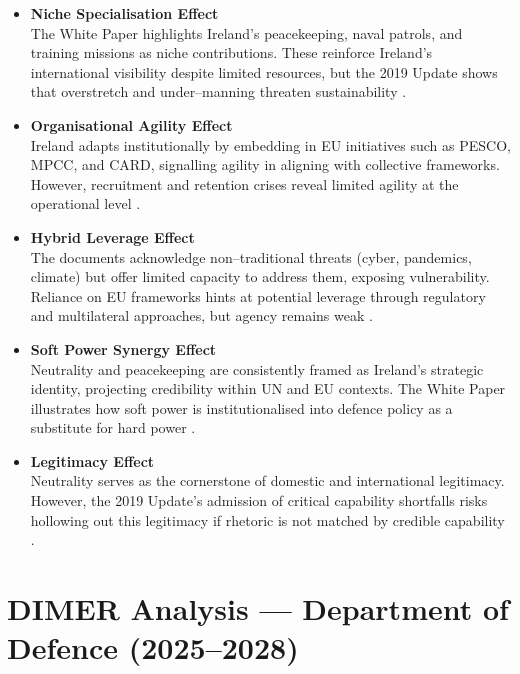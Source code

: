 \begin{itemize}
	\item \textbf{Niche Specialisation Effect} \\
	The White Paper highlights Ireland’s peacekeeping, naval patrols, and training missions as niche contributions. These reinforce Ireland’s international visibility despite limited resources, but the 2019 Update shows that overstretch and under–manning threaten sustainability \parencite{WHITE_2015}.
	
	\item \textbf{Organisational Agility Effect} \\
	Ireland adapts institutionally by embedding in EU initiatives such as PESCO, MPCC, and CARD, signalling agility in aligning with collective frameworks. However, recruitment and retention crises reveal limited agility at the operational level \parencite{WHITE_2015}.
	
	\item \textbf{Hybrid Leverage Effect} \\
	The documents acknowledge non–traditional threats (cyber, pandemics, climate) but offer limited capacity to address them, exposing vulnerability. Reliance on EU frameworks hints at potential leverage through regulatory and multilateral approaches, but agency remains weak \parencite{WHITE_2015}.
	
	\item \textbf{Soft Power Synergy Effect} \\
	Neutrality and peacekeeping are consistently framed as Ireland’s strategic identity, projecting credibility within UN and EU contexts. The White Paper illustrates how soft power is institutionalised into defence policy as a substitute for hard power \parencite{WHITE_2015}.
	
	\item \textbf{Legitimacy Effect} \\
	Neutrality serves as the cornerstone of domestic and international legitimacy. However, the 2019 Update’s admission of critical capability shortfalls risks hollowing out this legitimacy if rhetoric is not matched by credible capability \parencite{WHITE_2015}.
\end{itemize}

\section*{DIMER Analysis — Department of Defence (2025–2028)}

